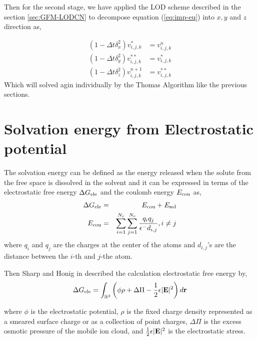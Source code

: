  Then for the second stage, we have applied the LOD scheme described in the section \ref{sec:GFM-LODCN} to decompose equation (\ref{eq:imp-eu}) into $x,y$ and $z$ direction as, 
 
\begin{eqnarray}
		(1-\Delta t \delta_x^2)v^*_{i,j,k} &= v^n_{i,j,k}\nonumber\\
		(1-\Delta t \delta_y^2)v^{**}_{i,j,k} &= v^*_{i,j,k}\\
		(1-\Delta t \delta_z^2)v^{n+1}_{i,j,k} &= v^{**}_{i,j,k}\nonumber
\end{eqnarray}	
Which will solved agin individually by the Thomas Algorithm like the previous sections. 

\section{Solvation energy from Electrostatic potential}

The solvation energy can be defined as the energy released when the solute from the free space is dissolved in the solvent and it can be expressed in terms of the electrostatic free energy $\Delta G_{\rm ele}$ and the coulomb energy $E_{\rm cou}$ as, 
\begin{eqnarray}
	\Delta G_{\rm ele}&=& E_{\rm cou}+ E_{\rm sol}\label{eq_Gele}\\
	E_{\rm cou} &=& \sum_{i=1}^{N_c}\sum_{j=1}^{N_c}\frac{q_iq_j}{\epsilon^-d_{i,j}}, i\neq j\label{eq_Ecou}
\end{eqnarray}
where $q_i$ and $q_j$ are the charges at the center of the atoms and $d_{i,j}$'s are the distance between the $i$-th and $j$-the atom. 
  
Then Sharp and Honig in \cite{Sharp_Honig}  described the calculation electrostatic free energy by, 
\begin{equation}
\Delta G_{\rm ele}=\int_{\mathbb{R}^3}\left(\phi\rho+\Delta\Pi-\frac{1}{2}\epsilon|{\bf E}|^2\right)d{\bf r}
\end{equation}

where $\phi$ is the electrostatic potential, $\rho$ is the fixed charge density represented as a smeared surface charge or as a collection of point charges, $\Delta\Pi$ is  the excess osmotic pressure of the mobile ion cloud, and $\frac{1}{2}\epsilon|{\bf E}|^2$ is the electrostatic stress.

